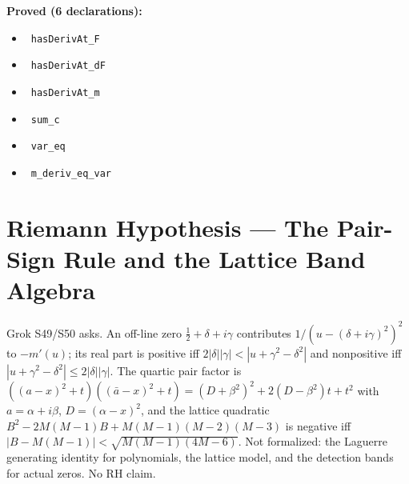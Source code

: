 \documentclass{report}
\theoremstyle{definition}
\begin{document}
\noindent\textbf{Proved (6 declarations):}
\begin{itemize}
  \item {}\leanok\ \texttt{hasDerivAt\_F}
  \item {}\leanok\ \texttt{hasDerivAt\_dF}
  \item {}\leanok\ \texttt{hasDerivAt\_m}
  \item {}\leanok\ \texttt{sum\_c}
  \item {}\leanok\ \texttt{var\_eq}
  \item {}\leanok\ \texttt{m\_deriv\_eq\_var}
\end{itemize}

\section{Riemann Hypothesis --- The Pair-Sign Rule and the Lattice Band Algebra}
Grok S49/S50 asks. An off-line zero $\tfrac12+\delta+i\gamma$ contributes $1/(u-(\delta+i\gamma)^2)^2$ to $-m'(u)$; its real part is positive iff $2|\delta||\gamma|<|u+\gamma^2-\delta^2|$ and nonpositive iff $|u+\gamma^2-\delta^2|\le2|\delta||\gamma|$. The quartic pair factor is $((a-x)^2+t)((\bar a-x)^2+t)=(D+\beta^2)^2+2(D-\beta^2)t+t^2$ with $a=\alpha+i\beta$, $D=(\alpha-x)^2$, and the lattice quadratic $B^2-2M(M-1)B+M(M-1)(M-2)(M-3)$ is negative iff $|B-M(M-1)|<\sqrt{M(M-1)(4M-6)}$. Not formalized: the Laguerre generating identity for polynomials, the lattice model, and the detection bands for actual zeros. No RH claim.
\end{document}
